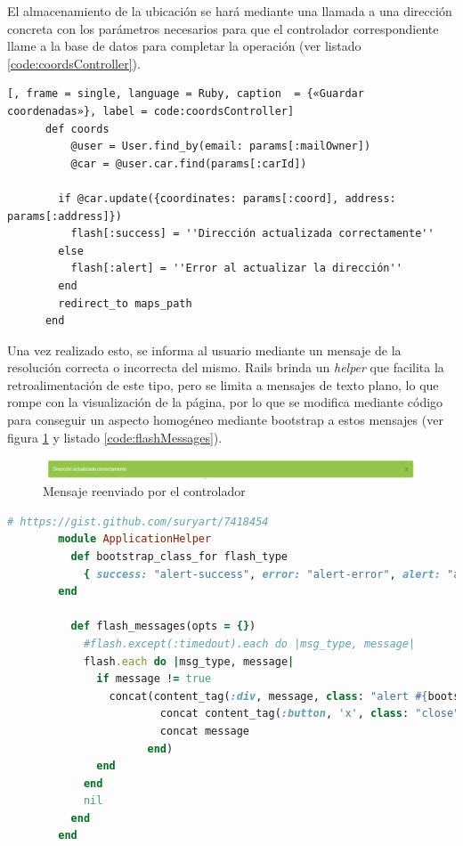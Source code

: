 	El almacenamiento de la ubicación se hará mediante una llamada a una dirección concreta con los parámetros necesarios para que el controlador correspondiente llame a la base de datos para completar la operación (ver listado \ref{code:coordsController}). 
	
	\begin{lstlisting}[, frame = single, language = Ruby, caption  = {«Guardar coordenadas»}, label = code:coordsController]
	  def coords
	      @user = User.find_by(email: params[:mailOwner])
	      @car = @user.car.find(params[:carId])
	
	    if @car.update({coordinates: params[:coord], address: params[:address]})
	      flash[:success] = ''Dirección actualizada correctamente''
	    else
	      flash[:alert] = ''Error al actualizar la dirección''
	    end
	    redirect_to maps_path
	  end
	\end{lstlisting}
	
	Una vez realizado esto, se informa al usuario mediante un mensaje de la resolución correcta o incorrecta del mismo. Rails brinda un \textit{helper} que facilita la retroalimentación de este tipo, pero se limita a mensajes de texto plano, lo que rompe con la visualización de la página, por lo que se modifica mediante código para conseguir un aspecto homogéneo mediante bootstrap a estos mensajes (ver figura \ref{fig:guardar_posiciones_2} y listado \ref{code:flashMessages}).
	
	\begin{figure}[H]
		\centering
		\includegraphics[width=15cm, fbox={\fboxrule} 4mm]{images/05-resultados/16-guardar_posiciones_2.png}
		\caption{Mensaje reenviado por el controlador}
		\label{fig:guardar_posiciones_2}
	\end{figure}
		
	\begin{lstlisting}[frame = single, language = Ruby, caption  = {«Código para sobreescribir los mensajes flash»}, label = code:flashMessages]
		# https://gist.github.com/suryart/7418454
		module ApplicationHelper
		  def bootstrap_class_for flash_type
		    { success: "alert-success", error: "alert-error", alert: "alert-warning", notice: "alert-info" }[flash_type.to_sym] || flash_type.to_s
		end
		
		  def flash_messages(opts = {})
		    #flash.except(:timedout).each do |msg_type, message|
		    flash.each do |msg_type, message|
		      if message != true
		        concat(content_tag(:div, message, class: "alert #{bootstrap_class_for(msg_type)} fade in", style: "margin-top:10px;") do 
		                concat content_tag(:button, 'x', class: "close", data: { dismiss: 'alert' })
		                concat message 
		              end)
		      end
		    end
		    nil
		  end
		end
	\end{lstlisting}	
		
